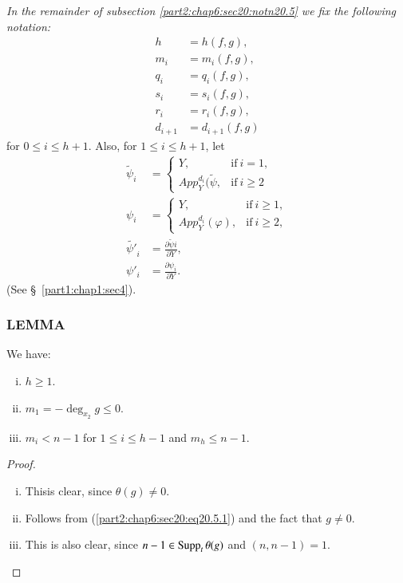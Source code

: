 {\em In the remainder of subsection \ref{part2:chap6:sec20:notn20.5}
  we fix the following notation:}
\begin{align*}
  h & = h(f, g),\\
  m_i & = m_i (f, g),\\
  q_i & = q_i (f, g),\\
  s_i & = s_i (f,g),\\
r_i & = r_i (f,g),\\
  d_{i+1} & = d_{i+1} (f, g)
\end{align*}
for $0 \leq i \leq h+1$. Also, for $1 \leq i \leq h+1$, let
\begin{align*}
  \tilde{\psi}_i & = 
  \begin{cases}
    Y, & \text{if}~ i=1,\\
    App_Y^{d_i} (\tilde{\psi}, & \text{if}~ i \geq 2
  \end{cases}\\
  \psi_i & =
  \begin{cases}
    Y, & \text{if}~ i \geq 1,\\
    App_Y^{d_i}(\varphi), & \text{if}~ i \geq 2,
  \end{cases}\\
  \tilde{\psi'}_i & = \frac{\partial \tilde{\psi} i}{\partial Y},\\
  \psi'_i & = \frac{\partial \psi_i}{\partial Y}.
\end{align*}
(See \S\ \ref{part1:chap1:sec4}).

\subsubsection{LEMMA}\label{part2:chap6:sec20:sss20.5.8}

We have:
\begin{enumerate}[(i)]
\item $h \geq 1$.
\item $m_1 =  - \deg_{x_2}g \leq 0$.
\item $m_i < n-1$ for $1 \leq i \leq h-1$ and $m_h \leq n-1$.
\end{enumerate}

\begin{proof}
\begin{enumerate}[(i)]
\item This\pageoriginale is clear, since $\theta (g)\neq 0$.
\item Follows from (\ref{part2:chap6:sec20:eq20.5.1}) and the fact
  that $g \neq 0$.
  \item This is also clear, since $n-1 \in \operatorname{Supp}_t \theta (g)$ and
    \gcd $(n, n-1)=1$.
\end{enumerate}
\end{proof}

